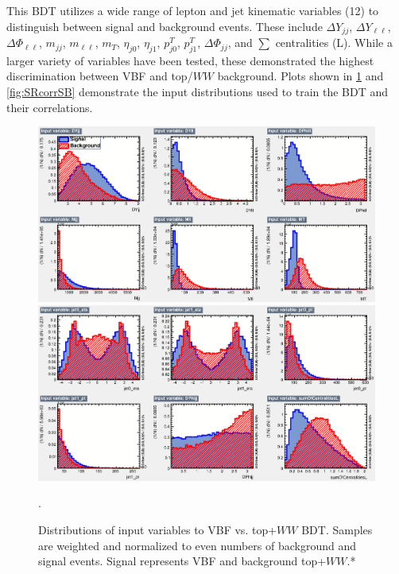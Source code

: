 This BDT utilizes a wide range of lepton and jet kinematic variables (12) to distinguish between signal and background events. These include $\Delta Y_{jj}$, $\Delta Y_{\ell\ell}$, $\Delta \Phi_{\ell\ell}$, $m_{jj}$, $m_{\ell\ell}$, $m_T$, $\eta_{j0}$, $\eta_{j1}$, $p^T_{j0}$, $p^T_{j1}$, $\Delta \Phi_{jj}$, and $\sum$ centralities (L). While a larger variety of variables have been tested, these demonstrated the highest discrimination between VBF and top/$WW$ background. Plots shown in \ref{fig:SRBDTinput} and \ref{fig:SRcorrSB} demonstrate the input distributions used to train the BDT and their correlations.
\begin{figure}[!htbp]
    \centering
    \includegraphics[width=0.45\linewidth]{Pictures/VBFvsWW+Top/variables_id_c1.eps}
    \includegraphics[width=0.45\linewidth]{Pictures/VBFvsWW+Top/variables_id_c2.eps}
    \caption{Distributions of input variables to VBF vs. top+$WW$ BDT. Samples are weighted and normalized to even numbers of background and signal events. Signal represents VBF and background top+$WW$.*}.
    \label{fig:SRBDTinput}
\end{figure}

